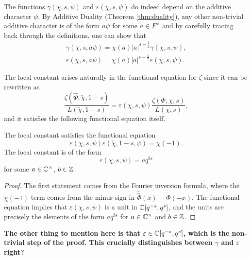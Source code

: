 \begin{rem}
    The functions $\gamma(\chi,s,\psi)$ and $\varepsilon(\chi,s,\psi)$ do indeed depend on the additive character $\psi$. By Additive Duality (Theorem \ref{thm:duality}), any other non-trivial additive character is of the form $a\psi$ for some $a\in F^\times$ and by carefully tracing back through the definitions, one can show that 
    \begin{align*}
        \gamma(\chi,s,a\psi)=\chi(a)|a|^{s-\frac{1}{2}}\gamma(\chi,s,\psi),\\
        \varepsilon(\chi,s,a\psi)=\chi(a)|a|^{s-\frac{1}{2}}\varepsilon(\chi,s,\psi).
    \end{align*}
\end{rem}

The local constant arises naturally in the functional equation for $\zeta$ since it can be rewritten as
$$\frac{\zeta(\hat{\Phi},\check{\chi},1-s)}{L(\check{\chi},1-s)} = \varepsilon(\chi,s,\psi) \frac{\zeta(\Phi,\chi,s)}{L(\chi,s)},$$
and it satisfies the following functional equation itself.

\begin{cor}
    The local constant satisfies the functional equation
    $$\varepsilon(\chi,s,\psi)\varepsilon(\check{\chi},1-s,\psi) = \chi(-1).$$
    The local constant is of the form $$\varepsilon(\chi,s,\psi) = aq^{bs}$$ for some $a \in \mathbb{C}^\times$, $b \in \mathbb{Z}$.
\end{cor}
\begin{proof}
    The first statement comes from the Fourier inversion formula, where the $\chi(-1)$ term comes from the minus sign in $\hat{\hat{\Phi}}(x) = \Phi(-x)$. The functional equation implies that $\varepsilon(\chi,s,\psi)$ is a unit in $\mathbb{C}[q^{-s},q^s]$, and the units are precisely the elements of the form $aq^{bs}$ for $a\in\mathbb{C}^\times$ and $b \in \mathbb{Z}$.
\end{proof}

\textbf{The other thing to mention here is that $\varepsilon\in\mathbb{C}[q^{-s},q^{s}]$, which is the non-trivial step of the proof. This crucially distinguishes between $\gamma$ and $\varepsilon$ right?}


